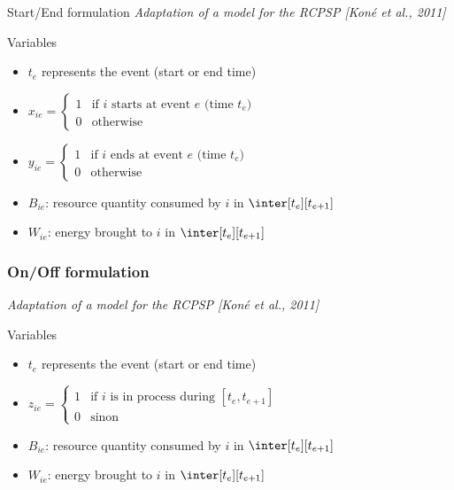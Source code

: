 \begin{frame}{Start/End formulation}
  {\small \it Adaptation of a model for the RCPSP {\color{gray!50!black!50} \it [Koné et al., 2011]}}
  \vfill
  \begin{block}{Variables}
    \begin{itemize}
    \item  $t_e$ represents the event (start or end time)
      \vspace{0.3cm}
    \item $x_{ie}=\left\{
        \begin{array}{ll}
          1 & \text{if $i$ starts at event $e$ (time $t_e$)}\\
          0 & \text{otherwise}
        \end{array}
      \right.
      $
      \vspace{0.3cm}
    \item $y_{ie}=\left\{
        \begin{array}{ll}
          1 & \text{if $i$ ends at event $e$ (time $t_e$)}\\
          0 & \text{otherwise}
        \end{array}
      \right.
      $
      \vspace{0.3cm}
    \item $B_{ie}$: resource quantity consumed by $i$ in $\inter[t_e][t_{e+1}]$
      \vspace{0.3cm}
    \item $W_{ie}$: energy brought to $i$ in $\inter[t_e][t_{e+1}]$   
    \end{itemize}
  \end{block}
\end{frame}


\begin{frame}
  \frametitle{On/Off formulation}
  {\small \it Adaptation of a model for the RCPSP {\color{gray!50!black!50} \it [Koné et al., 2011]}}
  \vfill
  \begin{block}{Variables}
    \begin{itemize}
    \item  $t_e$ represents the event (start or end time)
      \vspace{0.3cm}
    \item $z_{ie}=\left\{
        \begin{array}{ll}
          1 & \text{if $i$ is in process during $[t_{e},t_{e+1}]$}\\
          0 & \text{sinon}
        \end{array}
      \right.
      $
      \vspace{0.3cm}
    \item $B_{ie}$: resource quantity consumed by $i$ in $\inter[t_e][t_{e+1}]$
      \vspace{0.3cm}
    \item $W_{ie}$: energy brought to $i$ in $\inter[t_e][t_{e+1}]$   
    \end{itemize}
  \end{block}
\end{frame}

